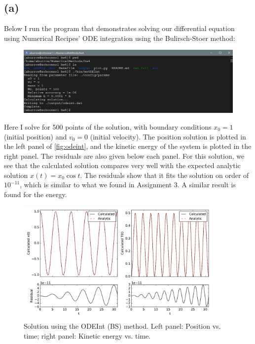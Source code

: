 \documentclass[12pt]{article}
\begin{document}
\subsection*{(a)}

Below I run the program that demonstrates solving our differential equation
using Numerical Recipes' ODE integration using the Bulirsch-Stoer method:
\begin{figure}[H]
    \centering
    \includegraphics[width=1\textwidth]{myODEInt}
    \label{fig:myODEInt}
\end{figure}

Here I solve for 500 points of the solution, with boundary conditions $x_0 =
1$ (initial position) and $v_0 = 0$ (initial velocity). The position solution
is plotted in the left panel of \autoref{fig:odeint}, and the kinetic energy of
the system is plotted in the right panel. The residuals are also given below
each panel. For this solution, we see that the calculated solution compares
very well with the expected analytic solution $x(t) = x_0 \cos t$. The
residuals show that it fits the solution on order of $10^{-11}$, which is
similar to what we found in Assignment 3. A similar result is found for the
energy.

\begin{figure}[ht]
    \centering
    \includegraphics[width=0.9\textwidth]{odeint}
    \caption{Solution using the ODEInt (BS) method. Left panel: Position vs.
             time; right panel: Kinetic energy vs. time.}
    \label{fig:odeint}
\end{figure}
\end{document}
